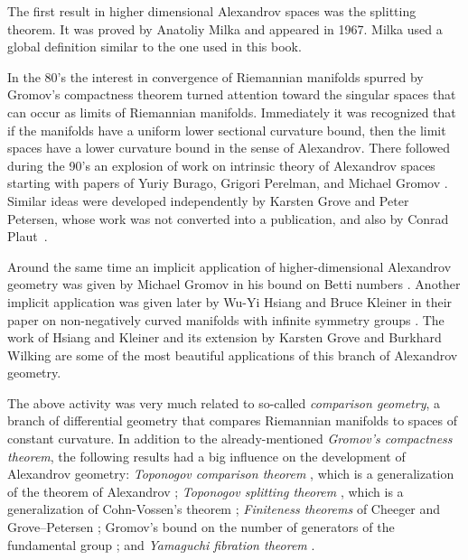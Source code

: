 The first result in higher dimensional Alexandrov spaces was the splitting theorem.
It was proved by Anatoliy Milka \cite{milka-line} and appeared in 1967.
Milka used a global definition similar to the one used in this book. %

{\sloppy 

In the 80's the interest in convergence of Riemannian manifolds spurred by Gromov's compactness theorem \cite{gromov-MS} turned attention toward the singular spaces that can occur as limits of Riemannian manifolds.
Immediately it was recognized that if the manifolds have a uniform lower sectional curvature bound, then the limit spaces have a lower curvature bound in the sense of Alexandrov.
There followed during the 90's an explosion of work on intrinsic theory of Alexandrov spaces  starting with papers of Yuriy Burago, Grigori Perelman, and Michael Gromov  \cite{burago-gromov-perelman,perelman:spaces2}.
Similar ideas were developed independently by Karsten Grove
and Peter Petersen, whose work was not converted into a publication, and also by
Conrad Plaut~\cite{plaut-preprint}.

}

Around the same time an implicit application of higher-dimensional Alexandrov geometry was given by Michael Gromov in his bound on Betti numbers \cite{gromov:betti}.
Another implicit application was given later by Wu-Yi Hsiang and Bruce Kleiner in their paper on non-negatively curved manifolds with infinite symmetry groups \cite{hsiang-kleiner}.
The work of Hsiang and Kleiner and its extension by Karsten Grove and Burkhard Wilking \cite{grove-wilking} are some of the most beautiful applications of this branch of Alexandrov geometry.

The above activity was very much related to so-called {}\emph{comparison geometry},
a branch of differential geometry that compares Riemannian manifolds  to  spaces of constant curvature.
In addition to the already-mentioned {}\emph{Gromov's compactness theorem},
the following results had a big influence on the development of Alexandrov geometry:
{}\emph{Toponogov comparison theorem} \cite{toponogov-globalization+splitting}, which is a generalization of the theorem of Alexandrov \cite{alexandrov-comparison};
{}\emph{Toponogov splitting theorem} \cite{toponogov-globalization+splitting}, which is a generalization of Cohn-Vossen's theorem \cite{cohn-vossen_line};
{}\emph{Finiteness theorems} of
Cheeger
and
Grove--Petersen \cite{cheeger-finiteness,grove-petersen:finiteness};
Gromov's bound on the number of generators of the fundamental group 
\cite[1.5]{gromov:almost-flat};
and 
{}\emph{Yamaguchi fibration theorem} \cite{yamaguchi-fibration}.

